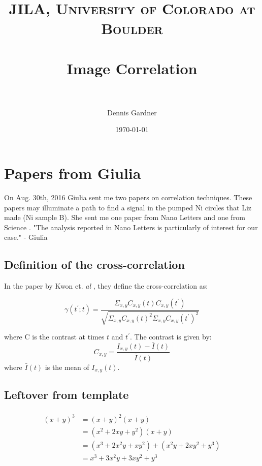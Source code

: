 \documentclass{article}
\title{	
\normalfont \normalsize 
\textsc{JILA, University of Colorado at Boulder} \\ [25pt] %
\horrule{0.5pt} \\[0.4cm] %
\huge Image Correlation \\ %
\horrule{2pt} \\[0.5cm] %
}
\author{Dennis Gardner} %
\date{\normalsize\today} %
\numberwithin{equation}{section} %
\numberwithin{figure}{section} %
\numberwithin{table}{section} %
\begin{document}
\maketitle %


\section{Papers from Giulia}

On Aug. 30th, 2016 Giulia sent me two papers on correlation techniques. These papers may illuminate a path to find a signal in the pumped Ni circles that Liz made (Ni sample B). She sent me one paper from Nano Letters \cite{Kwon2008} and one from Science \cite{Barwick2008a}. "The analysis reported in Nano Letters is particularly of interest for our case." - Giulia

\subsection{Definition of the cross-correlation}
In the paper by Kwon et. \textit{al} \cite{Kwon2008}, they define the cross-correlation as:


\begin{equation}\label{eq: xCorrDef}
	\gamma( t^\prime ; t ) = \frac{\Sigma_{x,y} C_{x,y}(t) C_{x,y}(t^\prime)}
                     {\sqrt{\Sigma_{x,y}C_{x,y}(t)^2\Sigma_{x,y}C_{x,y}(t^\prime)^2}}
\end{equation}

where C is the contrast at times $t$ and $t^\prime$. The contrast is given by:
\begin{equation}\label{(eq: contrastDef)}	
	C_{x,y} = \frac{I_{x,y}(t) - \bar{I}(t)}{\bar{I}(t)}
\end{equation}
where $\bar{I}(t)$ is the mean of $I_{x,y}(t)$. 





\clearpage

\subsection{Leftover from template}

\lipsum[2] %


\begin{align} 
\begin{split}
(x+y)^3 	&= (x+y)^2(x+y)\\
&=(x^2+2xy+y^2)(x+y)\\
&=(x^3+2x^2y+xy^2) + (x^2y+2xy^2+y^3)\\
&=x^3+3x^2y+3xy^2+y^3
\end{split}					
\end{align}
\end{document}
